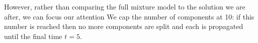 However, rather than comparing the full mixture model to the solution we are after, we can focus our attention
We cap the number of components at 10: if this number is reached then no more components are split and each is propagated until the final time \(t = 5\).







